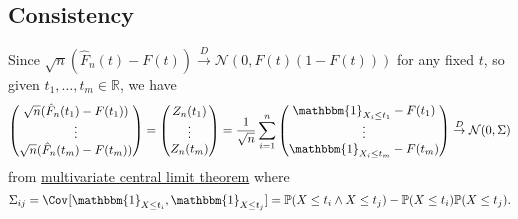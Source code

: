 \subsection{Consistency}
Since \(\sqrt{n} (\hat{F} _n(t) - F(t)) \overset{D}{\to} \mathcal{N} (0, F(t) (1 - F(t)))\) for any fixed \(t\), so given \(t_1, \dots , t_m \in \mathbb{R} \), we have
\[
	\begin{pmatrix}
		\sqrt{n} (\hat{F} _n(t_1) - F(t_1)) \\
		\vdots                              \\
		\sqrt{n} (\hat{F} _n(t_m) - F(t_m)) \\
	\end{pmatrix}
	= \begin{pmatrix}
		Z_n(t_1) \\
		\vdots   \\
		Z_n(t_m) \\
	\end{pmatrix}
	= \frac{1}{\sqrt{n} } \sum_{i=1}^{n} \begin{pmatrix}
		\mathbbm{1}_{X_i \leq t_1} - F(t_1) \\
		\vdots                              \\
		\mathbbm{1}_{X_i \leq t_m} - F(t_m) \\
	\end{pmatrix}
	\overset{D}{\to} \mathcal{N} (0, \Sigma )
\]
from \hyperref[thm:multivariate-CLT]{multivariate central limit theorem} where
\[
	\Sigma _{ij} = \Cov_{}[\mathbbm{1}_{X \leq t_i} , \mathbbm{1}_{X \leq t_j} ] = \mathbb{P} (X \leq t_i \land X \leq t_j) - \mathbb{P} (X \leq t_i) \mathbb{P} (X \leq t_j).
\]